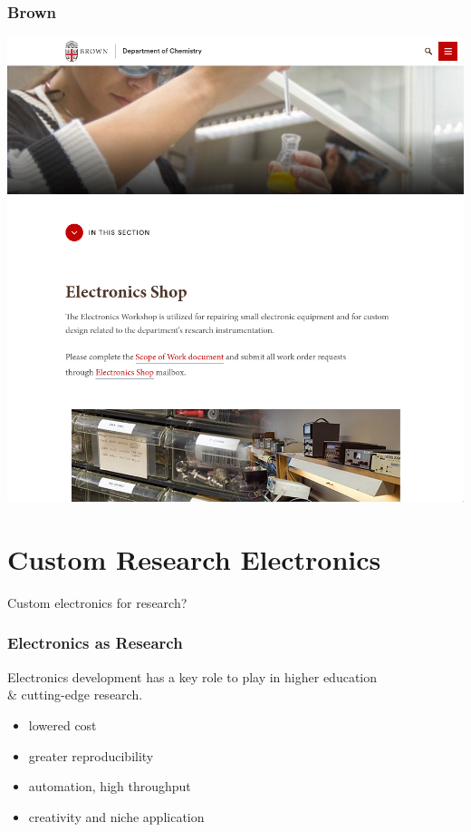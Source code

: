 \documentclass{presentation}
\begin{document}
{\begin{frame}\frametitle{Brown}
  \includegraphics[width=\textwidth]{"./brown.png"}
\end{frame}

}

\section{Custom Research Electronics}

\begin{frame}
  \huge
  Custom electronics for research?
\end{frame}

\begin{frame}\frametitle{Electronics as Research}
  Electronics development has a key role to play in higher education \\
  \& cutting-edge research.
  \begin{itemize}
    \item lowered cost
    \item greater reproducibility
    \item automation, high throughput
    \item creativity and niche application
  \end{itemize}
\end{frame}
\end{document}
